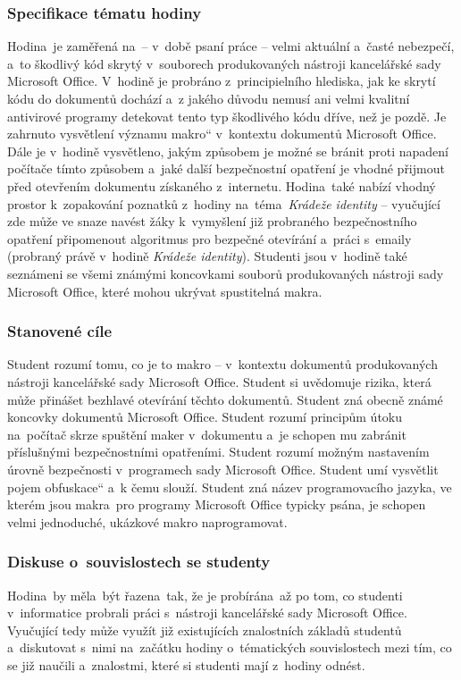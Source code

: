 \documentclass[a4paper, 12pt]{article}
\providecommand{\uv}[1]{\quotedblbase #1\textquotedblleft}
\begin{document}
\subsubsection{Specifikace tématu hodiny}
Hodina~je zaměřená na~-- v~době psaní práce -- velmi aktuální a~časté nebezpečí, a~to škodlivý kód skrytý v~souborech produkovaných nástroji kancelářské sady Microsoft Office. V~hodině je probráno z~principielního hlediska, jak ke skrytí kódu do dokumentů dochází a~z jakého důvodu nemusí ani velmi kvalitní antivirové programy detekovat tento typ škodlivého kódu dříve, než je pozdě. Je zahrnuto vysvětlení významu \uv{makro} v~kontextu dokumentů Microsoft Office. Dále je v~hodině vysvětleno, jakým způsobem je možné se bránit proti napadení počítače tímto způsobem a~jaké další bezpečnostní opatření je vhodné přijmout před otevřením dokumentu získaného z~internetu. Hodina~také nabízí vhodný prostor k~zopakování poznatků z~hodiny na~téma~\textit{Krádeže identity} -- vyučující zde může ve snaze navést žáky k~vymyšlení již probraného bezpečnostního opatření připomenout algoritmus pro bezpečné otevírání a~práci s~emaily (probraný právě v~hodině \textit{Krádeže identity}). Studenti jsou v~hodině také seznámeni se všemi známými koncovkami souborů produkovaných nástroji sady Microsoft Office, které mohou ukrývat spustitelná makra. 

\subsubsection{Stanovené cíle}
Student rozumí tomu, co je to makro -- v~kontextu dokumentů produkovaných nástroji kancelářské sady Microsoft Office. Student si uvědomuje rizika, která může přinášet bezhlavé otevírání těchto dokumentů. Student zná obecně známé koncovky dokumentů Microsoft Office. Student rozumí principům útoku na~počítač skrze spuštění maker v~dokumentu a~je schopen mu zabránit příslušnými bezpečnostními opatřeními. Student rozumí možným nastavením úrovně bezpečnosti v~programech sady Microsoft Office. Student umí vysvětlit pojem \uv{obfuskace} a~k čemu slouží. Student zná název programovacího jazyka, ve kterém jsou makra~pro programy Microsoft Office typicky psána, je schopen velmi jednoduché, ukázkové makro naprogramovat. 

\subsubsection{Diskuse o~souvislostech se studenty}
Hodina~by měla~být řazena~tak, že je probírána~až po tom, co studenti v~informatice probrali práci s~nástroji kancelářské sady Microsoft Office. Vyučující tedy může využít již existujících znalostních základů studentů a~diskutovat s~nimi na~začátku hodiny o~tématických souvislostech mezi tím, co se již naučili a~znalostmi, které si studenti mají z~hodiny odnést. 
\end{document}
